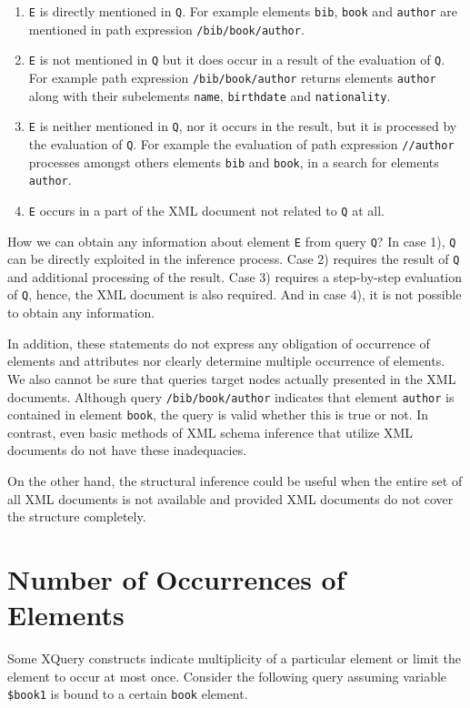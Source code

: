 \begin{enumerate}[1)]
\item \texttt{E} is directly mentioned in \texttt{Q}. For example elements \texttt{bib}, \texttt{book} and \texttt{author} are mentioned in path expression \texttt{/bib/book/author}.
\item \texttt{E} is not mentioned in \texttt{Q} but it does occur in a result of the evaluation of \texttt{Q}. For example path expression \texttt{/bib/book/author} returns elements \texttt{author} along with their subelements \texttt{name}, \texttt{birthdate} and \texttt{nationality}.
\item \texttt{E} is neither mentioned in \texttt{Q}, nor it occurs in the result, but it is processed by the evaluation of \texttt{Q}. For example the evaluation of path expression \texttt{//author} processes amongst others elements \texttt{bib} and \texttt{book}, in a search for elements \texttt{author}.
\item \texttt{E} occurs in a part of the XML document not related to \texttt{Q} at all.
\end{enumerate}

How we can obtain any information about element \texttt{E} from query \texttt{Q}? In case 1), \texttt{Q} can be directly exploited in the inference process. Case 2) requires the result of \texttt{Q} and additional processing of the result. Case 3) requires a step-by-step evaluation of \texttt{Q}, hence, the XML document is also required. And in case 4), it is not possible to obtain any information. 

In addition, these statements do not express any obligation of occurrence of elements and attributes nor clearly determine multiple occurrence of elements. We also cannot be sure that queries target nodes actually presented in the XML documents. Although query \texttt{/bib/book/author} indicates that element \texttt{author} is contained in element \texttt{book}, the query is valid whether this is true or not. In contrast, even basic methods of XML schema inference that utilize XML documents do not have these inadequacies.

On the other hand, the structural inference could be useful when the entire set of all XML documents is not available and provided XML documents do not cover the structure completely.

\section{Number of Occurrences of Elements}
Some XQuery constructs indicate multiplicity of a particular element or limit the element to occur at most once. Consider the following query assuming variable \texttt{\$book1} is bound to a certain \texttt{book} element.

